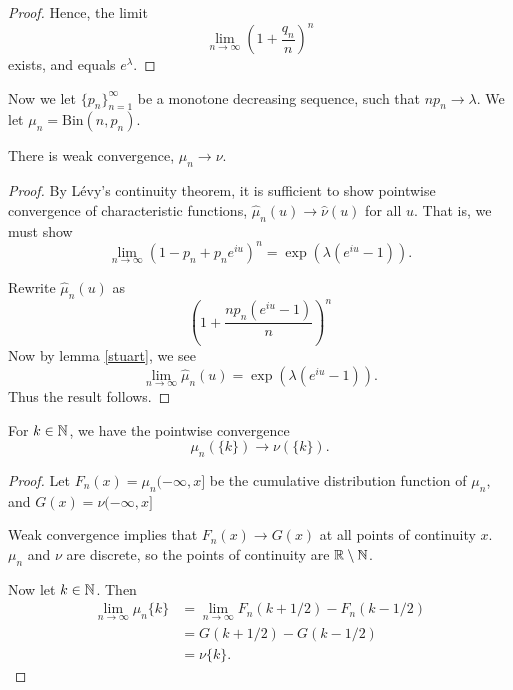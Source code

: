 \documentclass{unswmaths}
\begin{document}
\begin{proof}
    Hence, the limit
    \begin{equation*}
        \lim_{n\rightarrow\infty}\left(1+\frac{q_n}{n}\right)^n
    \end{equation*}
    exists, and equals $e^\lambda$.
\end{proof}

Now we let $\{p_n\}_{n=1}^\infty$ be a monotone decreasing sequence, such
that $np_n \rightarrow \lambda$. We let $\mu_n = \mathrm{Bin}(n,p_n)$.
\begin{theorem}
    There is weak convergence, $\mu_n\rightarrow\nu$.
\end{theorem}
\begin{proof}
    By L\'evy's continuity theorem, it is sufficient to show pointwise convergence
    of characteristic functions, $\hat{\mu}_n(u)\rightarrow \hat{\nu}(u)$
    for all $u$. That is, we must show
    \begin{equation*}
        \lim_{n\rightarrow\infty} (1-p_n+p_ne^{iu})^n = \exp(\lambda(e^{iu}-1)).
    \end{equation*}    
    
    Rewrite $\hat{\mu}_n(u)$ as
    \begin{equation*}
        \left(1+\frac{np_n(e^{iu}-1)}{n}\right)^n
    \end{equation*}
    Now by lemma \ref{stuart}, we see
    \begin{equation*}
        \lim_{n\rightarrow\infty} \hat{\mu}_n(u) = \exp(\lambda(e^{iu}-1)).
    \end{equation*}
    Thus the result follows.
\end{proof}

\begin{theorem}
    For $k \in \mathbb{N}$, we have the pointwise convergence
    \begin{equation*}
        \mu_n(\{k\})\rightarrow \nu(\{k\}).
    \end{equation*}
\end{theorem}
\begin{proof}
    Let $F_n(x) = \mu_n(-\infty,x]$ be the cumulative
    distribution function of $\mu_n$, and $G(x) = \nu(-\infty,x]$
    
    Weak convergence implies that $F_n(x)\rightarrow G(x)$
    at all points of continuity $x$. $\mu_n$
    and $\nu$ are discrete, so the points of continuity are
    $\mathbb{R}\setminus \mathbb{N}$. 
    
    Now let $k \in \mathbb{N}$. Then
    \begin{align*}
        \lim_{n\rightarrow\infty} \mu_n\{k\} &= \lim_{n\rightarrow\infty} F_n(k+1/2)-F_n(k-1/2)\\
        &= G(k+1/2)-G(k-1/2)\\
        &= \nu\{k\}.
    \end{align*}
\end{proof}
\end{document}
